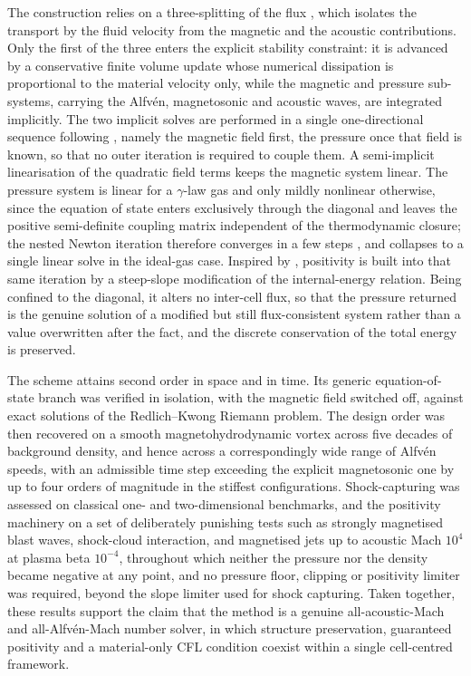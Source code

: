 \documentclass[a4paper,fleqn]{cas-sc}
\theoremstyle{definition}
\theoremstyle{remark}
\begin{document}
The construction relies on a three-splitting of the flux \cite{Fambri2021}, which isolates the transport
by the fluid velocity from the magnetic and the acoustic contributions. Only the first of
the three enters the explicit stability constraint: it is advanced by a conservative
finite volume update whose numerical dissipation is proportional to the material velocity
only, while the magnetic and pressure sub-systems, carrying the Alfv\'en, magnetosonic
and acoustic waves, are integrated implicitly. The two implicit solves are performed in a
single one-directional sequence following \cite{BoscheriThomann2024}, namely the magnetic field first, the pressure once that
field is known, so that no outer iteration is required to couple them. A semi-implicit
linearisation of the quadratic field terms keeps the magnetic system linear. The pressure
system is linear for a $\gamma$-law gas and only mildly nonlinear otherwise, since the
equation of state enters exclusively through the diagonal and leaves the positive semi-definite coupling matrix independent of the thermodynamic closure; the
nested Newton iteration therefore converges in a few steps \cite{DumbserCasulli2016}, and collapses to a single
linear solve in the ideal-gas case. Inspired by \cite{BrugnanoCasulli2009, Casulli2009}, positivity is built into that same iteration by a steep-slope modification of the
internal-energy relation. Being confined to the diagonal, it alters no inter-cell flux,
so that the pressure returned is the genuine solution of a modified but still
flux-consistent system rather than a value overwritten after the fact, and the discrete
conservation of the total energy is preserved. 

The scheme attains second order in space and in time. Its generic equation-of-state
branch was verified in isolation, with the magnetic field switched off, against exact
solutions of the Redlich--Kwong Riemann problem. The design order was then recovered on a
smooth magnetohydrodynamic vortex across five decades of background density, and hence
across a correspondingly wide range of Alfv\'en speeds, with an admissible time step
exceeding the explicit magnetosonic one by up to four orders of magnitude in the stiffest
configurations. Shock-capturing was assessed on classical one- and two-dimensional
benchmarks, and the positivity machinery on a set of deliberately punishing tests such as
strongly magnetised blast waves, shock-cloud interaction, and magnetised jets up to acoustic Mach
$10^4$ at plasma beta $10^{-4}$, throughout which neither the pressure nor the density
became negative at any point, and no pressure floor, clipping or positivity limiter was required, beyond the slope limiter used for shock capturing. Taken together,
these results support the claim that the method is a genuine all-acoustic-Mach and all-Alfv\'en-Mach 
number solver, in which structure preservation, guaranteed positivity and a material-only
CFL condition coexist within a single cell-centred framework.
\end{document}
